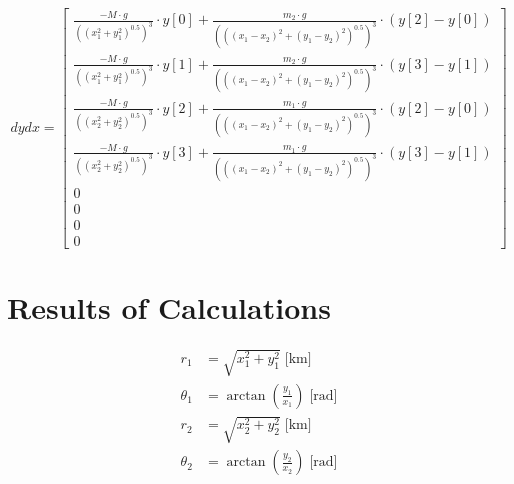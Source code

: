 \begin{equation}
dydx=\left[ \begin{matrix} \frac { -M\cdot g }{ \left( \left( x_{ 1 }^{ 2 }+y_{ 1 }^{ 2 } \right) ^{ 0.5 } \right) ^{ 3 } } \cdot y\left[ 0 \right] +\frac { m_{ 2 }\cdot g }{ \left( \left( \left( x_{ 1 }-x_{ 2 } \right) ^{ 2 }+\left( y_{ 1 }-y_{ 2 } \right) ^{ 2 } \right) ^{ 0.5 } \right)^{ 3 }  } \cdot\left( y\left[ 2 \right] -y\left[ 0 \right]  \right)  \\ \frac { -M\cdot g }{ \left( \left( x_{ 1 }^{ 2 }+y_{ 1 }^{ 2 } \right) ^{ 0.5 } \right) ^{ 3 } } \cdot y\left[ 1 \right] +\frac { m_{ 2 }\cdot g }{ \left( \left( \left( x_{ 1 }-x_{ 2 } \right) ^{ 2 }+\left( y_{ 1 }-y_{ 2 } \right) ^{ 2 } \right) ^{ 0.5 } \right) ^{ 3 } } \cdot \left( y\left[ 3 \right] -y\left[ 1 \right]  \right)  \\ \frac { -M\cdot g }{ \left( \left( x_{ 2 }^{ 2 }+y_{ 2 }^{ 2 } \right) ^{ 0.5 } \right) ^{ 3 } } \cdot y\left[ 2 \right] +\frac { m_{ 1 }\cdot g }{ \left( \left( \left( x_{ 1 }-x_{ 2 } \right) ^{ 2 }+\left( y_{ 1 }-y_{ 2 } \right) ^{ 2 } \right) ^{ 0.5 } \right) ^{ 3 } } \cdot \left( y\left[ 2 \right] -y\left[ 0 \right]  \right)  \\ \frac { -M\cdot g }{ \left( \left( x_{ 2 }^{ 2 }+y_{ 2 }^{ 2 } \right) ^{ 0.5 } \right) ^{ 3 } } \cdot y\left[ 3 \right] +\frac { m_{ 1 }\cdot g }{ \left( \left( \left( x_{ 1 }-x_{ 2 } \right) ^{ 2 }+\left( y_{ 1 }-y_{ 2 } \right) ^{ 2 } \right) ^{ 0.5 } \right) ^{ 3 } } \cdot \left( y\left[ 3 \right] -y\left[ 1 \right]  \right)  \\ 0 \\ 0 \\ 0 \\ 0 \end{matrix} \right] 
\label{eq:6}
\end{equation}




\section{Results of Calculations}


\begin{equation}
\begin{align*}
r_{ 1 }&=\sqrt { x_{ 1 }^{ 2 }+y_{ 1 }^{ 2 } } \; \text{[km]} \\ 
\theta _{ 1 }&=\arctan { \left( \frac { y_1 }{ x_1 }  \right)  } \; \text{[rad]} \\ 
r_{ 2 }&=\sqrt { x_{ 2 }^{ 2 }+y_{ 2 }^{ 2 } } \; \text{[km]} \\ 
\theta _{ 2 }&=\arctan { \left( \frac { y_2 }{ x_2 }  \right)  } \; \text{[rad]} 
\end{align*}
\label{eq:4}
\end{equation}


